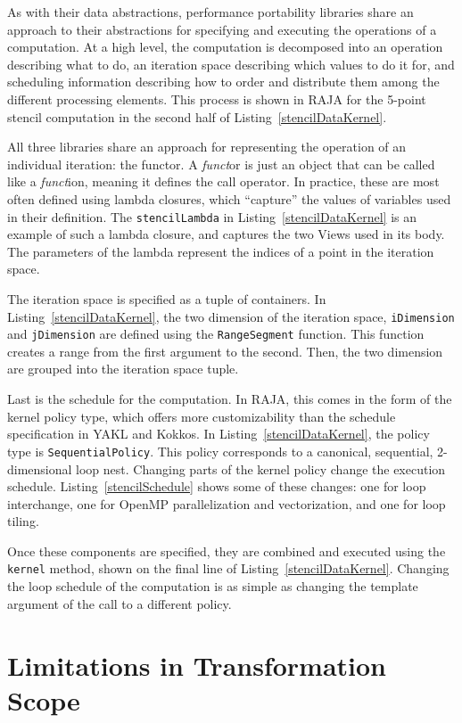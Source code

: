 As with their data abstractions, performance portability libraries share an approach to their abstractions for specifying and executing the operations of a computation.
At a high level, the computation is decomposed into an operation describing what to do, an iteration space describing which values to do it for, and scheduling information describing how to order and distribute them among the different processing elements.
This process is shown in RAJA for the 5-point stencil computation in the second half of Listing~\ref{stencilDataKernel}.

All three libraries share an approach for representing the operation of an individual iteration: the functor.
A \textit{funct}or is just an object that can be called like a \textit{funct}ion, meaning it defines the call operator. 
In practice, these are most often defined using lambda closures, which ``capture'' the values of variables used in their definition.
The \verb.stencilLambda. in Listing~\ref{stencilDataKernel} is an example of such a lambda closure, and captures the two Views used in its body.
The parameters of the lambda represent the indices of a point in the iteration space.

The iteration space is specified as a tuple of containers.
In Listing~\ref{stencilDataKernel}, the two dimension of the iteration space, \verb.iDimension. and \verb.jDimension. are defined using the \verb.RangeSegment. function.
This function creates a range from the first argument to the second.
Then, the two dimension are grouped into the iteration space tuple.

Last is the schedule for the computation.
In RAJA, this comes in the form of the kernel policy type, which offers more customizability than the schedule specification in YAKL and Kokkos.
In Listing~\ref{stencilDataKernel}, the policy type is \verb.SequentialPolicy..
This policy corresponds to a canonical, sequential, 2-dimensional loop nest.
Changing parts of the kernel policy change the execution schedule.  %
Listing~\ref{stencilSchedule} shows some of these changes: one for loop interchange, one for OpenMP parallelization and vectorization, and one for loop tiling.

Once these components are specified, they are combined and executed using the \verb.kernel. method, shown on the final line of Listing~\ref{stencilDataKernel}.
Changing the loop schedule of the computation is as simple as changing the template argument of the call to a different policy.

\section{Limitations in Transformation Scope}


